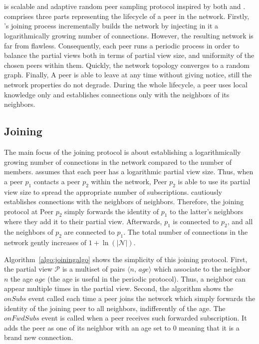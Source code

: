 
\section{\SCAMPLON{}}
\label{sec:proposal}

\SCAMPLON{} \SCAMPLONDESCRIPTION{} is scalable and adaptive random
peer sampling protocol inspired by both \SCAMP{} and \CYCLON{}. \SCAMPLON{}
comprises three parts representing the lifecycle of a peer in the network.
Firstly, \SCAMPLON{}'s joining process incrementally builds the network by
injecting in it a logarithmically growing number of connections. However, the
resulting network is far from flawless. Consequently, each peer runs a periodic
process in order to balance the partial views both in terms of partial view
size, and uniformity of the chosen peers within them. Quickly, the network
topology converges to a random graph. Finally, A peer is able to leave at any
time without giving notice, still the network properties do not degrade. During
the whole lifecycle, a peer uses local knowledge only and establishes
connections only with the neighbors of its neighbors.

\subsection{Joining}

The main focus of the joining protocol is about establishing a logarithmically
growing number of connections in the network compared to the number of members.
\SCAMPLON{} assumes that each peer has a logarithmic partial view size. Thus,
when a peer $p_1$ contacts a peer $p_2$ within the network, Peer $p_2$ is able
to use its partial view size to spread the appropriate number of subscriptions.
\SCAMPLON{} cautiously establishes connections with the neighbors of
neighbors. Therefore, the joining protocol at Peer $p_2$ simply forwards the
identity of $p_1$ to the latter's neighbors where they add it to their partial
view. Afterwards, $p_1$ is connected to $p_2$, and all the neighbors of $p_2$
are connected to $p_1$. The total number of connections in the network gently
increases of $1+\ln(|\mathcal{N}|)$.

Algorithm~\ref{algo:joiningalgo} shows the simplicity of this joining
protocol. First, the partial view $\mathcal{P}$ is a multiset of pairs
$\langle n,\, age\rangle$ which associate to the neighbor $n$ the age $age$
(the age is useful in the periodic protocol). Thus, a neighbor can appear
multiple times in the partial view. Second, the algorithm shows the $onSubs$
event called each time a peer joins the network which simply forwards the
identity of the joining peer to all neighbors, indifferently of the age. The
$onFwdSubs$ event is called when a peer receives such forwarded
subscription. It adds the peer as one of its neighbor with an age set to $0$
meaning that it is a brand new connection.

